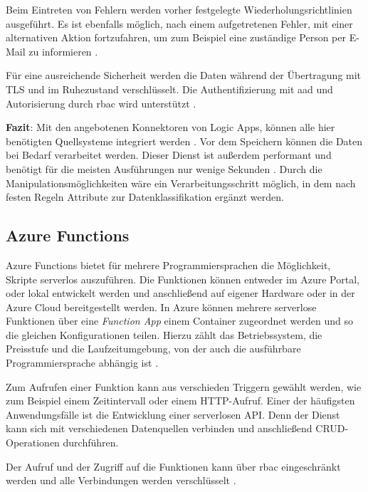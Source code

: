 Beim Eintreten von Fehlern werden vorher festgelegte Wiederholungsrichtlinien ausgeführt. Es ist ebenfalls möglich, nach einem aufgetretenen Fehler, mit einer alternativen Aktion fortzufahren, um zum Beispiel eine zuständige Person per E-Mail zu informieren \cite{fan_handle_2021}.

Für eine ausreichende Sicherheit werden die Daten während der Übertragung mit TLS und im Ruhezustand verschlüsselt. Die Authentifizierung mit \ac{aad} und Autorisierung durch \ac{rbac} wird unterstützt \cite{baldwin_azure_logicApps_2021}. 

\textbf{Fazit}: Mit den angebotenen Konnektoren von Logic Apps, können alle hier benötigten Quellsysteme integriert werden \cite[vgl.][]{fan_verwaltete_2021}. Vor dem Speichern können die Daten bei Bedarf verarbeitet werden. Dieser Dienst ist außerdem performant und benötigt für die meisten Ausführungen nur wenige Sekunden \cite{bennett_enterprise_2021}. Durch die Manipulationsmöglichkeiten wäre ein Verarbeitungsschritt möglich, in dem nach festen Regeln Attribute zur Datenklassifikation ergänzt werden.


\subsection{Azure Functions} \label{sec:grundlagen:azure_dienste:functions}
Azure Functions bietet für mehrere Programmiersprachen die Möglichkeit, Skripte serverlos auszuführen. Die Funktionen können entweder im Azure Portal, oder lokal entwickelt werden und anschließend auf eigener Hardware oder in der Azure Cloud bereitgestellt werden. In Azure können mehrere serverlose Funktionen über eine \textit{Function App} einem Container zugeordnet werden und so die gleichen Konfigurationen teilen. Hierzu zählt das Betriebssystem, die Preisstufe und die Laufzeitumgebung, von der auch die ausführbare Programmiersprache abhängig ist \cite{kurniawan_introduction_2019}.

Zum Aufrufen einer Funktion kann aus verschieden Triggern gewählt werden, wie zum Beispiel einem Zeitintervall oder einem HTTP-Aufruf. Einer der häufigsten Anwendungsfälle ist die Entwicklung einer serverlosen API. Denn der Dienst kann sich mit verschiedenen Datenquellen verbinden und anschließend CRUD-Operationen durchführen. 

Der Aufruf und der Zugriff auf die Funktionen kann über \ac{rbac} eingeschränkt werden \cite{satapathi_hands-azure_2021} und alle Verbindungen werden verschlüsselt \cite{gailey_securing_2021}.

